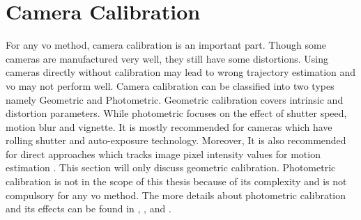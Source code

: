\section{Camera Calibration}
For any \acrshort{vo} method, camera calibration is an important part. Though some cameras are manufactured very well, they still have some distortions. Using cameras directly without calibration may lead to wrong trajectory estimation and \acrshort{vo} may not perform well. Camera calibration can be classified into two types namely Geometric and Photometric. Geometric calibration covers intrinsic and distortion parameters. While photometric focuses on the effect of shutter speed, motion blur and vignette. It is mostly recommended for cameras which have rolling shutter and auto-exposure technology. Moreover, It is also recommended for direct approaches which tracks image pixel intensity values for motion estimation \cite{yang2018challenges}. This section will only discuss geometric calibration. Photometric calibration is not in the scope of this thesis because of its complexity and is not compulsory for any \acrshort{vo} method. The more details about photometric calibration and its effects can be found in \cite{yang2018challenges}, \cite{photometrically}, \cite{bergmann2017online} and \cite{vignette}.\\

